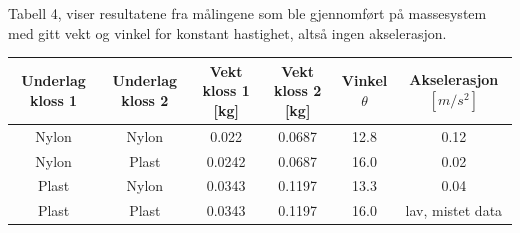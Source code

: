 \documentclass[10pt,a4paper]{report}
\begin{document}
\begin{center}
     \begin{tablenotes}
 	\small
 	\item Tabell 4, viser resultatene fra målingene som ble gjennomført på massesystem med gitt vekt og vinkel for konstant hastighet, altså ingen akselerasjon. 
 	\end{tablenotes}
  \begin{tabular}{| c | c | c | c | c  | c |}
    \hline
    Underlag kloss 1 & Underlag kloss 2 & Vekt kloss 1 [kg] & Vekt kloss 2 [kg] & Vinkel $\theta$ & Akselerasjon $[m/s^2]$ \\ \hline
    Nylon & Nylon & 0.022 & 0.0687 & 12.8 & 0.12 \\ \hline
    Nylon & Plast & 0.0242 & 0.0687 & 16.0 & 0.02 \\ \hline
    Plast & Nylon & 0.0343 & 0.1197 & 13.3 & 0.04 \\ \hline
    Plast & Plast & 0.0343 & 0.1197 & 16.0 & lav, mistet data  \\ \hline
  \end{tabular}
\end{center}
\end{document}
